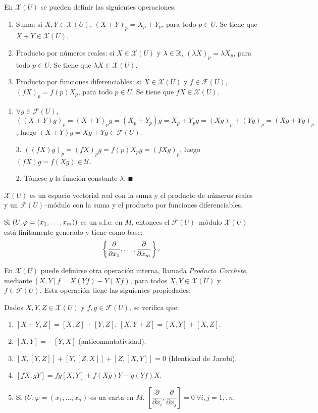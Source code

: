 \documentclass[Cursovd_portada.tex]{subfiles}
\begin{document}
\begin{prop}
En $\mathcal{X}(U)$ se pueden definir las siguientes operaciones:
\begin{enumerate}
\item Suma: si $X,Y\in\mathcal{X}(U)$, $(X+Y)_p=X_p+Y_p$, para todo $p\in U$. Se tiene que $X+Y\in\mathcal{X}(U)$.
\item Producto por números reales: si $X\in\mathcal{X}(U)$ y $\lambda\in\mathbb{R}$, $(\lambda X)_p=\lambda X_p$, para todo
$p\in U$. Se tiene que $\lambda X\in\mathcal{X}(U)$.
\item Producto por funciones diferenciables: si $X\in\mathcal{X}(U)$ y $f\in\mathcal{F}(U)$, $(fX)_p=f(p)X_p$, para todo
$p\in U$. Se tiene que $fX\in\mathcal{X}(U)$.
\end{enumerate}
\end{prop}
\begin{dem}\mbox{}
\begin{enumerate}
\item $\forall g \in \mathcal{F}(U)$, $((X+Y)g)_p = (X+Y)_pg = (X_p+Y_p)g = X_p+Y_pg = (Xg)_p+(Yg)_p = (Xg+Yg)_p$, luego $(X+Y)g = Xg+Yg \in \mathcal{F}(U)$.
\item[3.] $((fX)g)_p = (fX)_pg = f(p)X_pg = (fXg)_p$, luego $(fX)g = f(Xg) \in \mathcal{U}$.
\item[2.] Tómese $g$ la función constante $λ$. $\QED$
\end{enumerate}
\end{dem}
\begin{prop} $\mathcal{X}(U)$ es un espacio vectorial real con la suma y el producto de números reales y un
$\mathcal{F}(U)$--módulo con la suma y el producto por funciones diferenciables.
\end{prop}
\begin{prop}
Si $(U,\varphi=(x_1,\dots ,x_m))$ es un s.l.c. en $M$, entonces el $\mathcal{F}(U)$--módulo $\mathcal{X}(U)$ está
finitamente generado y tiene como base:
$$\left\{\displaystyle{\frac{\partial}{\partial x_1}},\dots ,\displaystyle{\frac{\partial}{\partial x_m}}\right\}.$$
\end{prop}
En $\mathcal{X}(U)$ puede definirse otra operación interna, llamada {\it Producto Corchete}, mediante
$[X,Y]f=X(Yf)-Y(Xf)$, para todos $X,Y\in\mathcal{X}(U)$ y $f\in\mathcal{F}(U)$. Esta operación tiene las
siguientes propiedades:
\begin{prop}
Dados $X,Y,Z\in\mathcal{X}(U)$ y $f,g\in\mathcal{F}(U)$, se verifica que:
\begin{enumerate}
\item $[X+Y,Z]=[X,Z]+[Y,Z]$; $[X,Y+Z]=[X,Y]+[X,Z]$.
\item $[X,Y]=-[Y,X]$ (anticonmutatividad).
\item $[X,[Y,Z]]+[Y,[Z,X]]+[Z,[X,Y]]=0$ (Identidad de Jacobi).
\item $[fX,gY]=fg[X,Y]+f(Xg)Y-g(Yf)X$.
\item Si $(U,\varphi=(x_1,\dots,x_n)$ es ua carta en $M$.  $\left[\dfrac{\partial}{\partial x_i},\dfrac{\partial}{\partial x_j}\right]=0\ \forall i,j=1,\dot, n$. 
\end{enumerate}
\end{prop}
\end{document}
